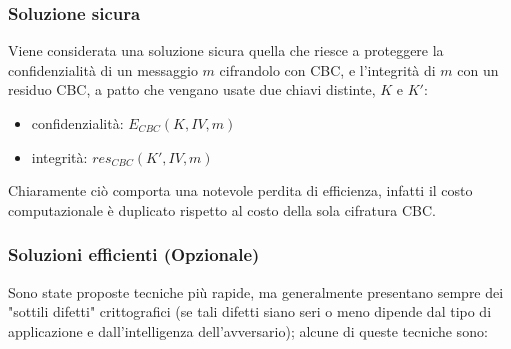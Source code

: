 \subsubsection{Soluzione sicura}
Viene considerata una soluzione sicura quella che riesce a proteggere la confidenzialità di un messaggio $m$ cifrandolo con CBC, e l'integrità di $m$ con un residuo CBC, a patto che vengano usate due chiavi distinte, $K$ e $K'$:
\begin{itemize}
\item confidenzialità: $E_{CBC}(K, IV, m)$
\item integrità: $res_{CBC}(K', IV, m)$
\end{itemize}
Chiaramente ciò comporta una notevole perdita di efficienza, infatti il costo computazionale è duplicato rispetto al costo della sola cifratura CBC.
\subsubsection{Soluzioni efficienti (Opzionale)}
Sono state proposte tecniche più rapide, ma generalmente presentano sempre dei "sottili difetti" crittografici (se tali difetti siano seri o meno dipende dal tipo di applicazione e dall'intelligenza dell'avversario); alcune di queste tecniche sono:
